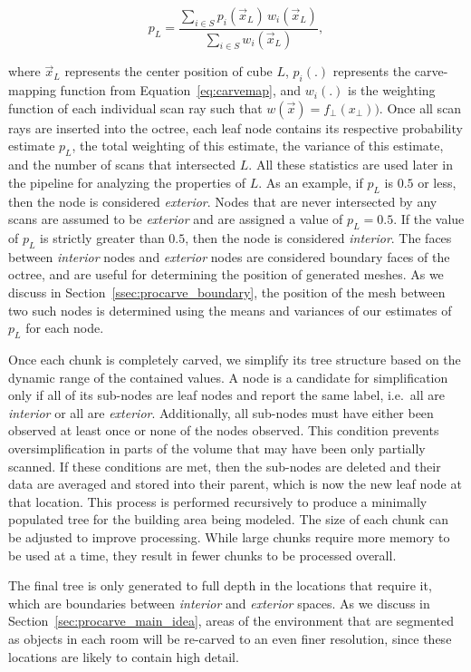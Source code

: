 \documentclass[12pt,onecolumn,oneside]{book}
\begin{document}
\begin{equation}
p_L = \dfrac{\sum\limits_{i \in S} p_i(\vec{x}_L) \, w_i(\vec{x}_L) }{ \sum\limits_{i \in S} w_i(\vec{x}_L) },
\end{equation}

\noindent where $\vec{x}_L$ represents the center position of cube $L$, $p_i(.)$ represents the carve-mapping function from Equation~\ref{eq:carvemap}, and $w_i(.)$ is the weighting function of each individual scan ray such that $w(\vec{x}) = f_{\perp}(x_{\perp}))$.  Once all scan rays are inserted into the octree, each leaf node contains its respective probability estimate $p_L$, the total weighting of this estimate, the variance of this estimate, and the number of scans that intersected $L$.  All these statistics are used later in the pipeline for analyzing the properties of $L$.  As an example, if $p_L$ is $0.5$ or less, then the node is considered {\it exterior}.  Nodes that are never intersected by any scans are assumed to be {\it exterior} and are assigned a value of $p_L=0.5$.  If the value of $p_L$ is strictly greater than $0.5$, then the node is considered {\it interior}.  The faces between {\it interior} nodes and {\it exterior} nodes are considered boundary faces of the octree, and are useful for determining the position of generated meshes.  As we discuss in Section~\ref{ssec:procarve_boundary}, the position of the mesh between two such nodes is determined using the means and variances of our estimates of $p_L$ for each node.

Once each chunk is completely carved, we simplify its tree structure based on the dynamic range of the contained values.  A node is a candidate for simplification only if all of its sub-nodes are leaf nodes and report the same label, i.e.\ all are {\it interior} or all are {\it exterior}.  Additionally, all sub-nodes must have either been observed at least once or none of the nodes observed.  This condition prevents oversimplification in parts of the volume that may have been only partially scanned.  If these conditions are met, then the sub-nodes are deleted and their data are averaged and stored into their parent, which is now the new leaf node at that location.  This process is performed recursively to produce a minimally populated tree for the building area being modeled.  The size of each chunk can be adjusted to improve processing.  While large chunks require more memory to be used at a time, they result in fewer chunks to be processed overall.

The final tree is only generated to full depth in the locations that require it, which are boundaries between {\it interior} and {\it exterior} spaces.  As we discuss in Section~\ref{sec:procarve_main_idea}, areas of the environment that are segmented as objects in each room will be re-carved to an even finer resolution, since these locations are likely to contain high detail.
\end{document}
